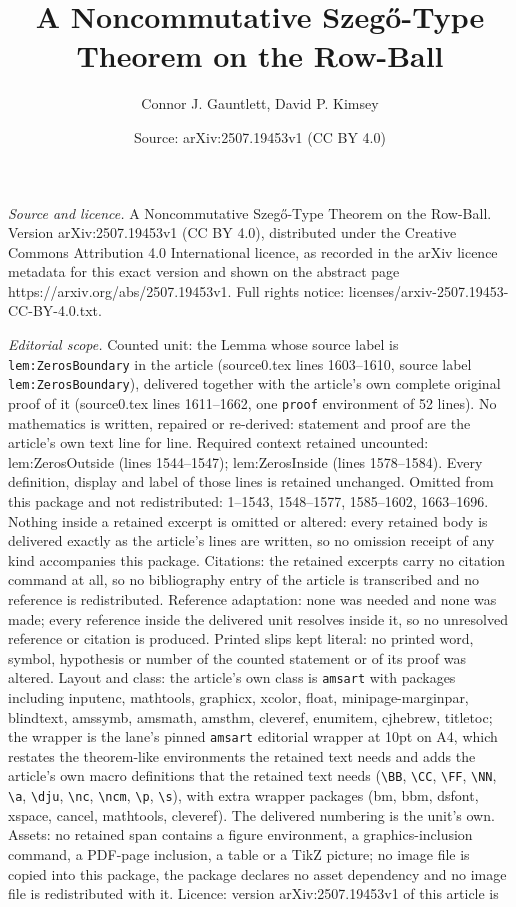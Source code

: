 \documentclass[10pt,a4paper]{amsart}
\title[A Noncommutative Szeg\H{o}-Type Theorem on the Row-Ball]{A Noncommutative Szeg\H{o}-Type Theorem on the Row-Ball}
\author{Connor J. Gauntlett, David P. Kimsey}
\date{Source: arXiv:2507.19453v1 (CC BY 4.0)}
\begin{document}
\maketitle

\noindent\emph{Source and licence.} A Noncommutative Szeg\H{o}-Type Theorem on the Row-Ball. Version arXiv:2507.19453v1 (CC BY 4.0), distributed under the Creative Commons Attribution 4.0 International licence, as recorded in the arXiv licence metadata for this exact version and shown on the abstract page https://arxiv.org/abs/2507.19453v1. Full rights notice: licenses/arxiv-2507.19453-CC-BY-4.0.txt.\par\smallskip

\noindent\textit{Editorial scope.} Counted unit: the Lemma whose source label is \texttt{lem:ZerosBoundary} in the article (source0.tex lines 1603--1610, source label \texttt{lem:ZerosBoundary}), delivered together with the article's own complete original proof of it (source0.tex lines 1611--1662, one \texttt{proof} environment of 52 lines). No mathematics is written, repaired or re-derived: statement and proof are the article's own text line for line. Required context retained uncounted: lem:ZerosOutside (lines 1544--1547); lem:ZerosInside (lines 1578--1584). Every definition, display and label of those lines is retained unchanged. Omitted from this package and not redistributed: 1--1543, 1548--1577, 1585--1602, 1663--1696. Nothing inside a retained excerpt is omitted or altered: every retained body is delivered exactly as the article's lines are written, so no omission receipt of any kind accompanies this package. Citations: the retained excerpts carry no citation command at all, so no bibliography entry of the article is transcribed and no reference is redistributed. Reference adaptation: none was needed and none was made; every reference inside the delivered unit resolves inside it, so no unresolved reference or citation is produced. Printed slips kept literal: no printed word, symbol, hypothesis or number of the counted statement or of its proof was altered. Layout and class: the article's own class is \texttt{amsart} with packages including inputenc, mathtools, graphicx, xcolor, float, minipage-marginpar, blindtext, amssymb, amsmath, amsthm, cleveref, enumitem, cjhebrew, titletoc; the wrapper is the lane's pinned \texttt{amsart} editorial wrapper at 10pt on A4, which restates the theorem-like environments the retained text needs and adds the article's own macro definitions that the retained text needs (\texttt{\textbackslash BB}, \texttt{\textbackslash CC}, \texttt{\textbackslash FF}, \texttt{\textbackslash NN}, \texttt{\textbackslash a}, \texttt{\textbackslash dju}, \texttt{\textbackslash nc}, \texttt{\textbackslash ncm}, \texttt{\textbackslash p}, \texttt{\textbackslash s}), with extra wrapper packages (bm, bbm, dsfont, xspace, cancel, mathtools, cleveref). The delivered numbering is the unit's own. Assets: no retained span contains a figure environment, a graphics-inclusion command, a PDF-page inclusion, a table or a TikZ picture; no image file is copied into this package, the package declares no asset dependency and no image file is redistributed with it. Licence: version arXiv:2507.19453v1 of this article is 
\end{document}
